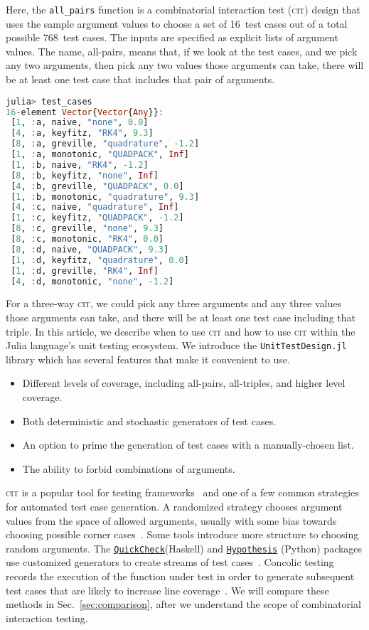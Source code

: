 \documentclass{juliacon}
\newcommand{\cit}{\textsc{cit}\xspace}
\begin{document}
Here, the \verb|all_pairs| function is a combinatorial interaction test (\cit) design that uses the sample argument values to choose a set of 16~test cases out of a total possible 768~test cases. The inputs are specified as explicit lists of argument values. The name, all-pairs, means that, if we look at the test cases, and we pick any two arguments, then pick any two values those arguments can take, there will be at least one test case that includes that pair of arguments.
\begin{lstlisting}[language=Julia]
julia> test_cases
16-element Vector{Vector{Any}}:
 [1, :a, naive, "none", 0.0]
 [4, :a, keyfitz, "RK4", 9.3]
 [8, :a, greville, "quadrature", -1.2]
 [1, :a, monotonic, "QUADPACK", Inf]
 [1, :b, naive, "RK4", -1.2]
 [8, :b, keyfitz, "none", Inf]
 [4, :b, greville, "QUADPACK", 0.0]
 [1, :b, monotonic, "quadrature", 9.3]
 [4, :c, naive, "quadrature", Inf]
 [1, :c, keyfitz, "QUADPACK", -1.2]
 [8, :c, greville, "none", 9.3]
 [8, :c, monotonic, "RK4", 0.0]
 [8, :d, naive, "QUADPACK", 9.3]
 [1, :d, keyfitz, "quadrature", 0.0]
 [1, :d, greville, "RK4", Inf]
 [4, :d, monotonic, "none", -1.2]
\end{lstlisting}
For a three-way \cit, we could pick any three arguments and any three values those arguments can take, and there will be at least one test case including that triple. In this article, we describe when to use \cit and how to use \cit within the Julia language's unit testing ecosystem. We introduce the \verb!UnitTestDesign.jl! library which has several features that make it convenient to use.
\begin{itemize}
    \item Different levels of coverage, including all-pairs, all-triples, and higher level coverage.
    \item Both deterministic and stochastic generators of test cases.
    \item An option to prime the generation of test cases with a manually-chosen list.
    \item The ability to forbid combinations of arguments.
\end{itemize}

\vskip 6pt
\cit is a popular tool for testing frameworks~\cite{pairwise-website} and one of a few common strategies for automated test case generation. A randomized strategy chooses argument values from the space of allowed arguments, usually with some bias towards choosing possible corner cases~\cite{Lampropoulos2020-sd,Arcuri2012-az}. Some tools introduce more structure to choosing random arguments. The \href{https://hackage.haskell.org/package/QuickCheck}{\texttt{QuickCheck}}(Haskell) and \href{https://github.com/HypothesisWorks/hypothesis}{\texttt{Hypothesis}} (Python) packages use customized generators to create streams of test cases~\cite{loscher2018automating}. Concolic testing records the execution of the function under test in order to generate subsequent test cases that are likely to increase line coverage~\cite{King1976-jt,Wang2018-xh,vira2019}. We will compare these methods in Sec.~\ref{sec:comparison}, after we understand the scope of combinatorial interaction testing.
\end{document}
